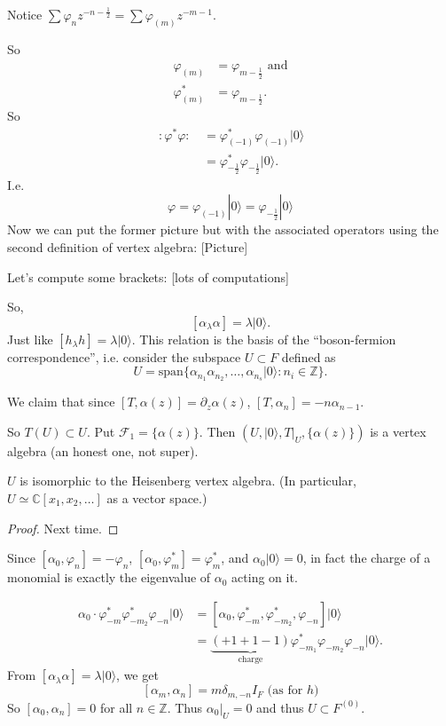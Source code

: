 Notice $\sum \varphi_n z^{-n-\frac{1}{2}}=
\sum \varphi_{(m)}z^{-m-1}$.

So
\begin{align*}
\varphi_{(m)}&=\varphi_{m-\frac{1}{2}}\text{ and}\\
\varphi^*_{(m)}&=\varphi_{m-\frac{1}{2}}.
\end{align*}
So
\begin{align*}
\,:\!\varphi^*\varphi\!:\,&=\varphi_{(-1)}^*\varphi_{(-1)}|0\rangle\\
&=\varphi_{-\frac{1}{2}}^*\varphi_{-\frac{1}{2}}|0\rangle.
\end{align*}
I.e.
$$
\varphi=\varphi_{(-1)}|0\rangle=\varphi_{-\frac{1}{2}}|0\rangle
$$
Now we can put the former picture but with the
associated operators using the
second definition of vertex algebra: [Picture]

Let's compute some brackets: [lots of computations]

So,
$$
[\alpha_\lambda \alpha]=\lambda |0\rangle.
$$
Just like $[h_\lambda h]=\lambda |0\rangle$.
This relation is the basis of the 
``boson-fermion correspondence'', i.e.
consider the subspace $U \subset F$ defined as
 $$
U=\text{span}\{\alpha_{n_1}\alpha_{n_2},\ldots,\alpha_{n_s}|0\rangle
:n_{i} \in \mathbb{Z}\}.
$$

We claim that since $[T,\alpha(z)]=\partial_z \alpha(z)$,
$[T,\alpha_n]=-n\alpha_{n-1}$.

So $T(U) \subset U$. Put $\mathcal{F}_1=\{\alpha(z)\}$.
Then $(U,|0\rangle,T|_{U},\{\alpha(z)\})$ is a vertex algebra
(an honest one, not super).

\begin{proposition}
\label{proposition-isomorphic-to-Heisenberg}
$U$ is isomorphic to the Heisenberg
vertex algebra. (In particular,
$U \simeq \mathbb{C}[x_1,x_2,\ldots]$
as a vector space.)
\end{proposition}

\begin{proof}
Next time.
\end{proof}

Since $[\alpha_0,\varphi_n]=-\varphi_n$,
$[\alpha_0,\varphi_m^*]=\varphi_m^*$,
and $\alpha_0 |0\rangle=0$, in fact the
charge of a monomial is exactly the
eigenvalue of $\alpha_0$ acting on it.

\begin{align*}
\alpha_0\cdot\varphi^*_{-m}\varphi^*_{-m_2}\varphi_{-n}|0\rangle
&=[\alpha_0,\varphi^*_{-m},\varphi^*_{-m_2},\varphi_{-n}]|0\rangle\\
&=\underbrace{(+1+1-1)}_{\text{charge}}
\varphi_{-m_1}^*\varphi_{-m_2}\varphi_{-n}|0\rangle.
\end{align*}
From $[\alpha_\lambda \alpha]=\lambda |0\rangle$,
we get
$$
[\alpha_m,\alpha_n]=m\delta_{m,-n}I_F\text{ (as for $h$)}
$$
So $[\alpha_0,\alpha_n]=0$ for all $n \in \mathbb{Z}$.
Thus  $\alpha_0 |_{ U}=0$ and thus $U \subset F^{(0)}$.

